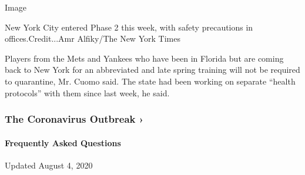 Image

New York City entered Phase 2 this week, with safety precautions in
offices.Credit...Amr Alfiky/The New York Times

Players from the Mets and Yankees who have been in Florida but are
coming back to New York for an abbreviated and late spring training will
not be required to quarantine, Mr. Cuomo said. The state had been
working on separate ``health protocols'' with them since last week, he
said.

\href{https://www.nytimes.com/news-event/coronavirus?action=click\&pgtype=Article\&state=default\&region=MAIN_CONTENT_3\&context=storylines_faq}{}

\hypertarget{the-coronavirus-outbreak-}{%
\subsubsection{The Coronavirus Outbreak
›}\label{the-coronavirus-outbreak-}}

\hypertarget{frequently-asked-questions}{%
\paragraph{Frequently Asked
Questions}\label{frequently-asked-questions}}

Updated August 4, 2020

